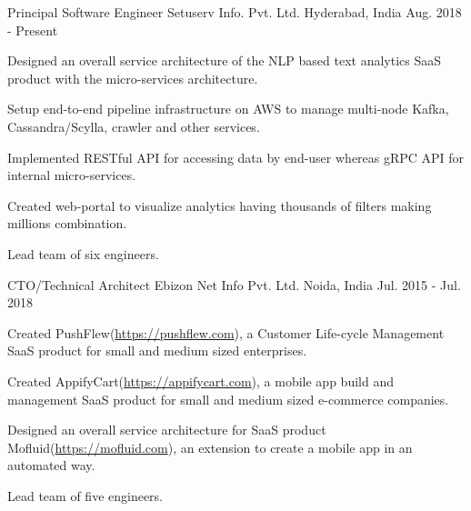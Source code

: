

\begin{cventries}

  \cventry
    {Principal Software Engineer} %
    {Setuserv Info. Pvt. Ltd.} %
    {Hyderabad, India} %
    {Aug. 2018 - Present} %
    {
      \begin{cvitems} %
        \item {Designed an overall service architecture of the NLP based text analytics SaaS product with the micro-services architecture.}
        \item {Setup end-to-end pipeline infrastructure on AWS to manage multi-node Kafka, Cassandra/Scylla, crawler and other services.}
        \item {Implemented RESTful API for accessing data by end-user whereas gRPC API for internal micro-services.} 
        \item {Created web-portal to visualize analytics having thousands of filters making millions combination.}
        \item {Lead team of six engineers.}
      \end{cvitems}
    }

  \cventry
    {CTO/Technical Architect} %
    {Ebizon Net Info Pvt. Ltd.} %
    {Noida, India} %
    {Jul. 2015 - Jul. 2018} %
    {
      \begin{cvitems} %
        \item {Created PushFlew(\href{https://pushflew.com}{https://pushflew.com}), a Customer Life-cycle Management SaaS product for small and medium sized enterprises.}
        \item {Created AppifyCart(\href{https://appifycart.com}{https://appifycart.com}), a mobile app build and management SaaS product for small and medium sized e-commerce companies.}
        \item {Designed an overall service architecture for SaaS product Mofluid(\href{https://mofluid.com}{https://mofluid.com}), an extension to create a mobile app in an automated way.}
        \item {Lead team of five engineers.}
      \end{cvitems}
    }


\end{cventries}
